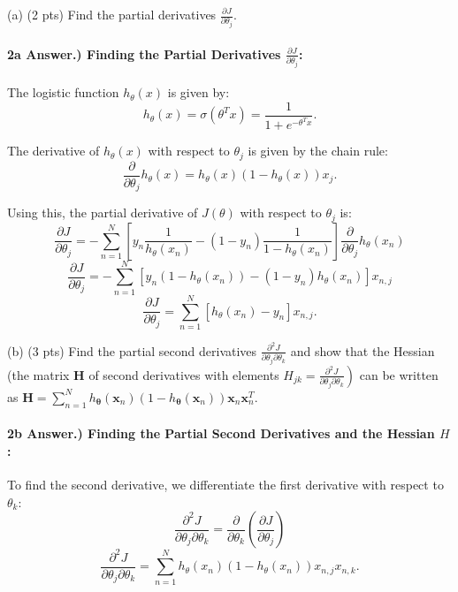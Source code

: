 \documentclass[10pt]{article}
\begin{document}
(a) (2 pts) Find the partial derivatives $\frac{\partial J}{\partial \theta_{j}}$.

\paragraph{2a Answer.) Finding the Partial Derivatives $\frac{\partial J}{\partial \theta_j}$:}
\hspace{1 cm}

The logistic function $h_{\theta}(x)$ is given by:
\[ h_{\theta}(x) = \sigma(\theta^T x) = \frac{1}{1+e^{-\theta^T x}}. \]

The derivative of $h_{\theta}(x)$ with respect to $\theta_j$ is given by the chain rule:
\[ \frac{\partial}{\partial \theta_j} h_{\theta}(x) = h_{\theta}(x)(1 - h_{\theta}(x))x_j. \]

Using this, the partial derivative of $J(\theta)$ with respect to $\theta_j$ is:
\[ \frac{\partial J}{\partial \theta_j} = -\sum_{n=1}^{N} \left[ y_n \frac{1}{h_{\theta}(x_n)} - (1 - y_n) \frac{1}{1 - h_{\theta}(x_n)} \right] \frac{\partial}{\partial \theta_j} h_{\theta}(x_n) \]
\[ \frac{\partial J}{\partial \theta_j} = -\sum_{n=1}^{N} \left[ y_n (1 - h_{\theta}(x_n)) - (1 - y_n) h_{\theta}(x_n) \right] x_{n,j} \]
\[ \frac{\partial J}{\partial \theta_j} = \sum_{n=1}^{N} \left[ h_{\theta}(x_n) - y_n \right] x_{n,j}. \]


(b) (3 pts) Find the partial second derivatives $\frac{\partial^{2} J}{\partial \theta_{j} \partial \theta_{k}}$ and show that the Hessian (the matrix $\boldsymbol{H}$ of second derivatives with elements $\left.H_{j k}=\frac{\partial^{2} J}{\partial \theta_{j} \partial \theta_{k}}\right)$ can be written as $\boldsymbol{H}=\sum_{n=1}^{N} h_{\boldsymbol{\theta}}\left(\boldsymbol{x}_{n}\right)\left(1-h_{\boldsymbol{\theta}}\left(\boldsymbol{x}_{n}\right)\right) \boldsymbol{x}_{n} \boldsymbol{x}_{n}^{T}$.

\paragraph{2b Answer.) Finding the Partial Second Derivatives and the Hessian $H$:}
\hspace{1 cm}

To find the second derivative, we differentiate the first derivative with respect to $\theta_k$:
\[ \frac{\partial^2 J}{\partial \theta_j \partial \theta_k} = \frac{\partial}{\partial \theta_k} \left( \frac{\partial J}{\partial \theta_j} \right) \]
\[ \frac{\partial^2 J}{\partial \theta_j \partial \theta_k} = \sum_{n=1}^{N} h_{\theta}(x_n)(1 - h_{\theta}(x_n)) x_{n,j} x_{n,k}. \]
\end{document}
